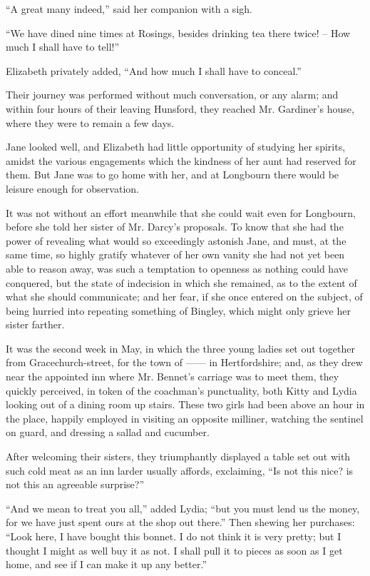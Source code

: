 “A great many indeed,” said her companion with
a sigh.

“We have dined nine times at Rosings, besides drinking
tea there twice! -- How much I shall have to tell!”

Elizabeth privately added, “And how much I shall
have to conceal.”

Their journey was performed without much conversation,
or any alarm; and within four hours of their
leaving Hunsford, they reached Mr. Gardiner’s house,
where they were to remain a few days.

Jane looked well, and Elizabeth had little opportunity
of studying her spirits, amidst the various engagements
which the kindness of her aunt had reserved for them.
But Jane was to go home with her, and at Longbourn
there would be leisure enough for observation.

It was not without an effort meanwhile that she could
wait even for Longbourn, before she told her sister of
Mr. Darcy’s proposals. To know that she had the power
of revealing what would so exceedingly astonish Jane,
and must, at the same time, so highly gratify whatever
of her own vanity she had not yet been able to reason
away, was such a temptation to openness as nothing could
have conquered, but the state of indecision in which she
remained, as to the extent of what she should communicate;
and her fear, if she once entered on the subject, of
being hurried into repeating something of Bingley, which
might only grieve her sister farther.


It was the second week in May, in which the three
young ladies set out together from Gracechurch-street, for
the town of ------ in Hertfordshire; and, as they drew
near the appointed inn where Mr. Bennet’s carriage was
to meet them, they quickly perceived, in token of the
coachman’s punctuality, both Kitty and Lydia looking
out of a dining room up stairs. These two girls had been
above an hour in the place, happily employed in visiting
an opposite milliner, watching the sentinel on guard, and
dressing a sallad and cucumber.

After welcoming their sisters, they triumphantly displayed
a table set out with such cold meat as an inn larder
usually affords, exclaiming, “Is not this nice? is not
this an agreeable surprise?”

“And we mean to treat you all,” added Lydia; “but
you must lend us the money, for we have just spent ours
at the shop out there.” Then shewing her purchases:
“Look here, I have bought this bonnet. I do not think
it is very pretty; but I thought I might as well buy it
as not. I shall pull it to pieces as soon as I get home,
and see if I can make it up any better.”

